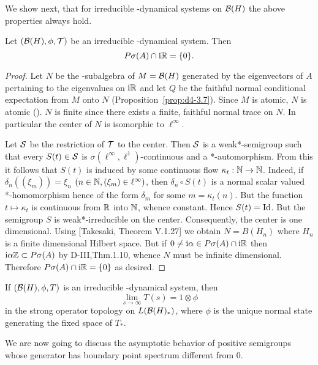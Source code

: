 We show next, that for irreducible \WA-dynamical systems on $ \mathcal{B}(H) $  the above properties always hold.
\begin{theorem}\label{thm:d4-3.8}
Let $ (\mathcal{B}(H),\phi,\mathcal{T}) $  be an irreducible \WA-dynamical system.
Then
\[
P\sigma(A) \cap \mathrm{i}\mathbb{R} = \{0\} .
\]

\end{theorem}
\begin{proof}
Let $ N $  be the \WA-subalgebra of $ M = \mathcal{B}(H) $  generated by the eigenvectors of $ A $  pertaining to the eigenvalues on $ \mathrm{i}\mathbb{R} $  and let $ Q $  be the faithful normal conditional expectation from $ M $  onto $ N $  (Proposition~\ref{prop:d4-3.7}).
Since $ M $  is atomic, $ N $  is atomic (\citet{stormer:1972}).
$ N $  is finite since there exists a finite, faithful normal trace on $ N $.
In particular the center of $ N $  is isomorphic to $ \ell^{\infty} $.

Let $ \mathcal{S} $  be the restriction of $ \mathcal{T} $  to the center.
Then $ \mathcal{S} $  is a weak*-semigroup such that every $ S(t) \in \mathcal{S} $  is $ \sigma(\ell^{\infty},\ell^{1}) $-continuous and a *-automorphism.
From this it follows that $ S(t) $  is induced by some continuous flow $ \kappa_{t}: \mathbb{N} \to \mathbb{N} $.
Indeed, if $ \delta_{n}((\xi_{m})) = \xi_{n} $  $ (n \in \mathbb{N}, (\xi_{m}) \in \ell^{\infty}) $, then $ \delta_{n} \circ S(t) $  is a normal scalar valued *-homomorphism hence of the form $ \delta_{m} $  for some $ m = \kappa_{t}(n) $.
But the function $ t \mapsto \kappa_{t} $  is continuous from $ \mathbb{R} $  into $ \mathbb{N} $, whence constant.
Hence $ S(t) = \operatorname{Id} $.
But the semigroup $ S $  is weak*-irreducible on the center.
Consequently, the center is one dimensional.
Using [Takesaki, Theorem V.1.27] we obtain $ N = B(H_{n}) $  where $ H_{n} $  is a finite dimensional Hilbert space.
But if $ 0 \neq \mathrm{i}\alpha \in P\sigma(A) \cap \mathrm{i}\mathbb{R} $  then $ \mathrm{i}\alpha\mathbb{Z} \subset P\sigma(A) $  by D-III,Thm.1.10, whence $ N $  must be infinite dimensional.
Therefore $ P\sigma(A) \cap \mathrm{i}\mathbb{R} = \{0\} $  as desired.
\end{proof}
\begin{corollary}\label{cor:d4-3.9}
If $ (\mathcal{B}(H),\phi,T) $  is an irreducible \WA-dynamical system, then
\[
	\lim_{s \to \infty} T(s) = 1 \otimes \phi
\]
in the strong operator topology on $ L(\mathcal{B}(H)_{*}) $, where $ \phi $  is the unique normal state generating the fixed space of $ T_{*} $.
\end{corollary}
We are now going to discuss the asymptotic behavior of positive semigroups whose generator has boundary point spectrum different from $ 0 $.
